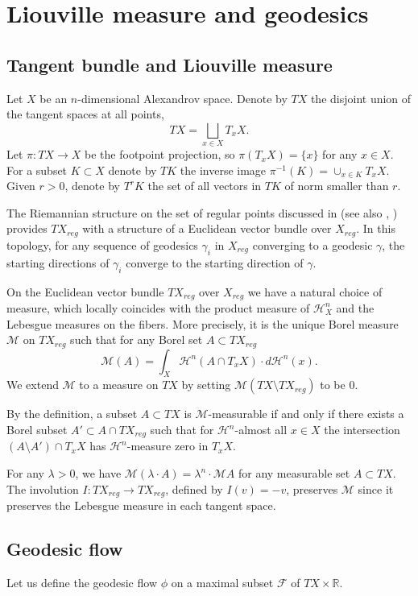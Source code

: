 \documentclass[12pt,leqno,intlimits]{amsart}
\numberwithin{equation}{section}
\theoremstyle{definition}
\theoremstyle{remark}
\newcommand{\R}{\mathbb{R}}
\def\:{\colon}
\begin{document}
\section{Liouville measure and geodesics} \label{sec:Liou}
\subsection{Tangent bundle and Liouville measure} \label{subsec:tb}
Let $X$ be an $n$-dimensional Alexandrov space.
Denote by $TX$ the disjoint union of the tangent spaces at all points,
\[TX=\bigsqcup_{x\in X} T_x X.\]
Let $\pi\:TX\to X$ be the footpoint projection, so $\pi (T_xX)=\{x\}$ for any $x\in X$. %
For a subset $K\subset X$ denote by $TK$ the inverse image $\pi^{-1} (K)= \cup _{x\in K} T_xX$. %
Given $r>0$, denote by $T^r K$ the set of all vectors in $TK$ of norm smaller than $r$.


The Riemannian structure on the set of regular points discussed in \cite{Otsu-Shioya} (see also \cite{Shioya}, \cite{Per-DC}) provides $TX_{reg}$ with a structure of a Euclidean vector bundle over $X_{reg}$. In this topology, for any sequence of geodesics $\gamma _i$ in $X_{reg}$ converging to a geodesic $\gamma$, the starting directions of $\gamma _i$ converge to the starting direction of $\gamma$.

On the Euclidean vector bundle $TX_{reg}$ over $X_{reg}$ we have a natural choice of measure, which locally coincides with the product measure of $\mathcal H^n _X$ and the Lebesgue measures on the fibers. More precisely,
it is the unique Borel measure $\mathcal M$ on $TX_{reg}$ such that for any Borel set $A\subset TX_{reg}$
$$\mathcal M(A)= \int _X \mathcal H^n(A \cap T_x X) \cdot d\mathcal H^n (x).$$
We extend $\mathcal M$ to a measure on $TX$ by setting $\mathcal M(TX\setminus TX_{reg})$ to be $0$.

By the definition, a subset $A\subset TX$ is $\mathcal M$-measurable if and only if there exists a Borel subset $A'\subset A\cap TX_{reg}$ such that
for $\mathcal H^n$-almost all $x\in X$ the intersection $(A\setminus A') \cap T_xX$ has $\mathcal H^n$-measure zero in $T_xX$.

For any $\lambda>0$, we have $\mathcal M(\lambda\cdot A)=\lambda^n\cdot\mathcal MA$ for any measurable set $A\subset TX$.
The involution $I\:TX_{reg}\to TX_{reg}$, defined by $I(v)=-v$,
preserves $\mathcal M$
since it preserves the Lebesgue measure in each tangent space.


\subsection{Geodesic flow}
Let us define the geodesic flow $\phi$ on a maximal subset $\mathcal F$ of $TX\times\R$.
\end{document}
